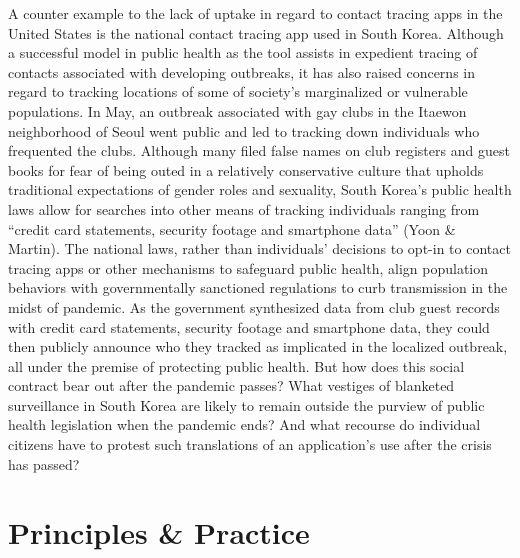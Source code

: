 \documentclass[11pt,dvipdfm]{article}
\begin{document}
A counter example to the lack of uptake in regard to contact tracing apps in the United States is the national contact tracing app used in South Korea.  Although a successful model in public health as the tool assists in expedient tracing of contacts associated with developing outbreaks, it has also raised concerns in regard to tracking locations of some of society’s marginalized or vulnerable populations.  In May, an outbreak associated with gay clubs in the Itaewon neighborhood of Seoul went public and led to tracking down individuals who frequented the clubs.  Although many filed false names on club registers and guest books for fear of being outed in a relatively conservative culture that upholds traditional expectations of gender roles and sexuality, South Korea’s public health laws allow for searches into other means of tracking individuals ranging from ``credit card statements, security footage and smartphone data'' (Yoon \& Martin).   The national laws, rather than individuals’ decisions to opt-in to contact tracing apps or other mechanisms to safeguard public health, align population behaviors with governmentally sanctioned regulations to curb transmission in the midst of pandemic.  As the government synthesized data from club guest records with credit card statements, security footage and smartphone data, they could then publicly announce who they tracked as implicated in the localized outbreak, all under the premise of protecting public health.  But how does this social contract bear out after the pandemic passes?  What vestiges of blanketed surveillance in South Korea are likely to remain outside the purview of public health legislation when the pandemic ends?  And what recourse do individual citizens have to protest such translations of an application’s use after the crisis has passed? 

\section{Principles \& Practice}
\end{document}

